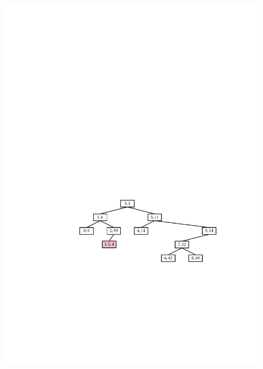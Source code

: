 \begin{figure}
  \begin{center}
  \includegraphics[width=\ScaleIfNeeded]{figs/treap-insert-a} \\

\end{center}
\end{figure}
